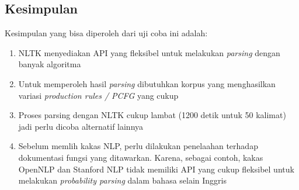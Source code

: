 \documentclass[paper=a4, fontsize=11pt]{scrartcl} %
\numberwithin{equation}{section} %
\numberwithin{figure}{section} %
\numberwithin{table}{section} %
\begin{document}
\subsection{Kesimpulan}

Kesimpulan yang bisa diperoleh dari uji coba ini adalah:

\begin{enumerate}
	\item NLTK menyediakan API yang fleksibel untuk melakukan \textit{parsing} dengan banyak algoritma
	\item Untuk memperoleh hasil \textit{parsing} dibutuhkan korpus yang menghasilkan variasi \textit{production rules / PCFG} yang cukup
	\item Proses parsing dengan NLTK cukup lambat (1200 detik untuk 50 kalimat) jadi perlu dicoba alternatif lainnya
	\item Sebelum memlih kakas NLP, perlu dilakukan penelaahan terhadap dokumentasi fungsi yang ditawarkan. Karena, sebagai contoh, kakas OpenNLP dan Stanford NLP tidak memiliki API yang cukup fleksibel untuk melakukan \textit{probability parsing} dalam bahasa selain Inggris
\end{enumerate}

\end{document}
